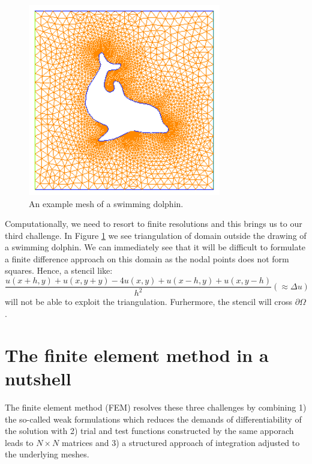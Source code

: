 \begin{figure}
\begin{center}
\includegraphics[width=0.75\textwidth]{chapters/elliptic/pics/dolfin_mesh_crop.png}
\caption{An example mesh of a swimming dolphin.}
\label{fig:dolphin}
\end{center}
\end{figure}



Computationally, we need to resort to finite resolutions and this brings us to our third 
challenge. In Figure \ref{fig:dolphin} we see triangulation of domain outside the drawing of a swimming dolphin. We
can immediately see that it will be difficult to formulate a finite difference approach on this domain
as the nodal points does not form squares. Hence, a stencil like: 
\[
	\frac{u(x+h,y) + u(x,y+y) -4 u(x,y) + u(x-h,y) + u(x, y-h) }{h^2} (\approx \Delta u) 
\]
will not be able to exploit the triangulation. Furhermore, the stencil will cross $\partial \Omega$.   


\section{The finite element method in a nutshell}

The finite element method (FEM) resolves these three challenges by combining 1) the so-called weak formulations
which reduces the demands of differentiability of the solution with 2) 
trial and test functions constructed by the same apporach leads to $N\times N$ matrices and 3)  
a structured approach of integration
adjusted to the underlying meshes. 

